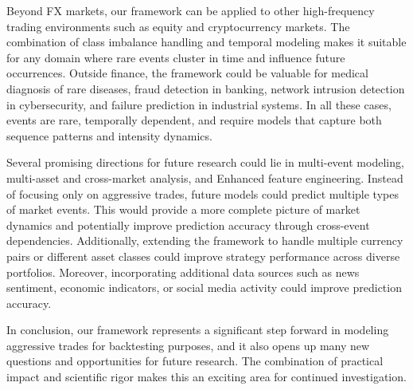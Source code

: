 
Beyond FX markets, our framework can be applied to other high-frequency trading environments such as equity and cryptocurrency markets. The combination of class imbalance handling and temporal modeling makes it suitable for any domain where rare events cluster in time and influence future occurrences. Outside finance, the framework could be valuable for medical diagnosis of rare diseases, fraud detection in banking, network intrusion detection in cybersecurity, and failure prediction in industrial systems. In all these cases, events are rare, temporally dependent, and require models that capture both sequence patterns and intensity dynamics.

Several promising directions for future research could lie in multi-event modeling, multi-asset and cross-market analysis, and Enhanced feature engineering. Instead of focusing only on aggressive trades, future models could predict multiple types of market events. This would provide a more complete picture of market dynamics and potentially improve prediction accuracy through cross-event dependencies. Additionally, extending the framework to handle multiple currency pairs or different asset classes could improve strategy performance across diverse portfolios. Moreover, incorporating additional data sources such as news sentiment, economic indicators, or social media activity could improve prediction accuracy. 

In conclusion, our framework represents a significant step forward in modeling aggressive trades for backtesting purposes, and it also opens up many new questions and opportunities for future research. The combination of practical impact and scientific rigor makes this an exciting area for continued investigation.
